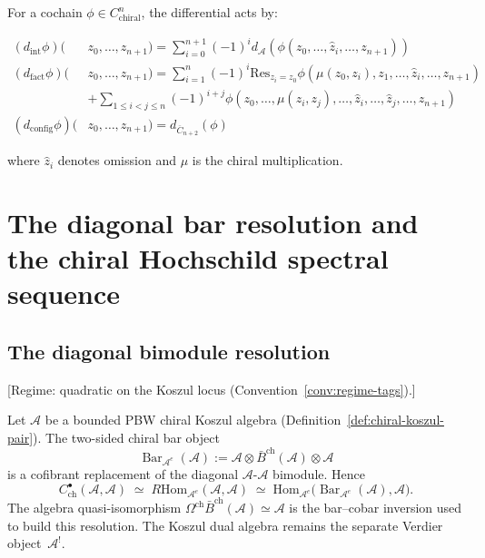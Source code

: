 For a cochain $\phi \in C^n_{\text{chiral}}$, the differential acts by:

\begin{align}
(d_{\text{int}}\phi)(&z_0,\ldots,z_{n+1}) = \sum_{i=0}^{n+1} (-1)^i d_{\mathcal{A}}(\phi(z_0,\ldots,\hat{z}_i,\ldots,z_{n+1})) \\
(d_{\text{fact}}\phi)(&z_0,\ldots,z_{n+1}) = \sum_{i=1}^n (-1)^i \text{Res}_{z_i = z_0} \phi(\mu(z_0,z_i),z_1,\ldots,\hat{z}_i,\ldots,z_{n+1}) \\
&+ \sum_{1 \leq i < j \leq n} (-1)^{i+j} \phi(z_0,\ldots,\mu(z_i,z_j),\ldots,\hat{z}_i,\ldots,\hat{z}_j,\ldots,z_{n+1}) \\
(d_{\text{config}}\phi)(&z_0,\ldots,z_{n+1}) = d_{\overline{C}_{n+2}}(\phi)
\end{align}

where $\hat{z}_i$ denotes omission and $\mu$ is the chiral multiplication.

\section{The diagonal bar resolution and the chiral Hochschild spectral sequence}

\subsection{The diagonal bimodule resolution}

\begin{theorem}\label{thm:hochschild-bar-cobar}
\textup{[Regime: quadratic on the Koszul locus
\textup{(}Convention~\textup{\ref{conv:regime-tags})}.]}

Let $\mathcal{A}$ be a bounded PBW chiral Koszul algebra
\textup{(}Definition~\textup{\ref{def:chiral-koszul-pair})}. The
two-sided chiral bar object
\[
\operatorname{Bar}_{\mathcal{A}^{e}}(\mathcal{A})
:=
\mathcal{A}\otimes
\bar{B}^{\mathrm{ch}}(\mathcal{A})\otimes\mathcal{A}
\]
is a cofibrant replacement of the diagonal
$\mathcal{A}$-$\mathcal{A}$ bimodule. Hence
\[
C^{\bullet}_{\mathrm{ch}}(\mathcal{A},\mathcal{A})
\;\simeq\;
R\mathrm{Hom}_{\mathcal{A}^{e}}(\mathcal{A},\mathcal{A})
\;\simeq\;
\mathrm{Hom}_{\mathcal{A}^{e}}
\bigl(\operatorname{Bar}_{\mathcal{A}^{e}}(\mathcal{A}),\mathcal{A}\bigr).
\]
The algebra quasi-isomorphism
$\Omega^{\mathrm{ch}}\bar{B}^{\mathrm{ch}}(\mathcal{A})\simeq
\mathcal{A}$ is the bar--cobar inversion used to build this
resolution. The Koszul dual algebra remains the separate Verdier
object~$\mathcal{A}^{!}$.
\end{theorem}

